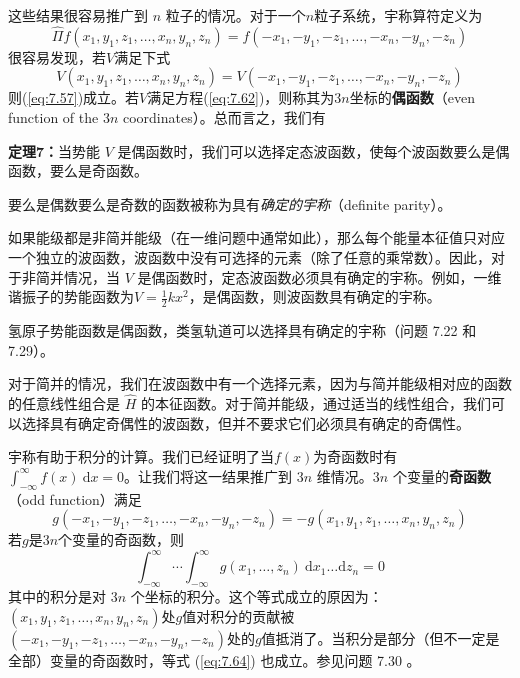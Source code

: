     这些结果很容易推广到 $n$ 粒子的情况。对于一个$n$粒子系统，宇称算符定义为
    \begin{equation}
        \hat{\Pi}f\left(x_1,y_1,z_1,\ldots,x_n,y_n,z_n\right) = f\left(-x_1,-y_1,-z_1,\ldots,-x_n,-y_n,-z_n\right)
        \label{eq:7.61}
    \end{equation}
    很容易发现，若$V$满足下式
    \begin{equation}
        V\left(x_1,y_1,z_1,\ldots,x_n,y_n,z_n\right) = V\left(-x_1,-y_1,-z_1,\ldots,-x_n,-y_n,-z_n\right)
        \label{eq:7.62}
    \end{equation}
    则(\ref{eq:7.57})成立。若$V$满足方程(\ref{eq:7.62})，则称其为$3n$坐标的\textbf{偶函数}（even function of the $3n$ coordinates）。总而言之，我们有
    \begin{center}
        \parbox{0.8\textwidth}{
            \textbf{定理7：}当势能 $V$ 是偶函数时，我们可以选择定态波函数，使每个波函数要么是偶函数，要么是奇函数。
        }
    \end{center}

    要么是偶数要么是奇数的函数被称为具有\textit{确定的宇称}（definite parity）。

    如果能级都是非简并能级（在一维问题中通常如此），那么每个能量本征值只对应一个独立的波函数，波函数中没有可选择的元素（除了任意的乘常数）。因此，对于非简并情况，当 $V$ 是偶函数时，定态波函数必须具有确定的宇称。例如，一维谐振子的势能函数为$V = \frac{1}{2}kx^2$，是偶函数，则波函数具有确定的宇称。

    氢原子势能函数是偶函数，类氢轨道可以选择具有确定的宇称（问题 7.22 和 7.29）。

    对于简并的情况，我们在波函数中有一个选择元素，因为与简并能级相对应的函数的任意线性组合是 $\hat{H}$ 的本征函数。对于简并能级，通过适当的线性组合，我们可以选择具有确定奇偶性的波函数，但并不要求它们必须具有确定的奇偶性。

    宇称有助于积分的计算。我们已经证明了当$f\left(x\right)$为奇函数时有$\int_{-\infty}^{\infty}f\left(x\right)\:\mathrm{d}x = 0$。让我们将这一结果推广到 $3n$ 维情况。$3n$ 个变量的\textbf{奇函数}（odd function）满足
    \begin{equation}
        g\left(-x_1,-y_1,-z_1,\ldots,-x_n,-y_n,-z_n\right) = -g\left(x_1,y_1,z_1,\ldots,x_n,y_n,z_n\right)
        \label{eq:7.63}
    \end{equation}
    若$g$是$3n$个变量的奇函数，则
    \begin{equation}
        \int_{-\infty}^{\infty}\cdots\int_{-\infty}^{\infty}g\left(x_1,\ldots,z_n\right)\:\mathrm{d}x_1\ldots\mathrm{d}z_n = 0
        \label{eq:7.64}
    \end{equation}
    其中的积分是对 $3n$ 个坐标的积分。这个等式成立的原因为：$\left(x_1,y_1,z_1,\ldots,x_n,y_n,z_n\right)$处$g$值对积分的贡献被$\left(-x_1,-y_1,-z_1,\ldots,-x_n,-y_n,-z_n\right)$处的$g$值抵消了。当积分是部分（但不一定是全部）变量的奇函数时，等式 (\ref{eq:7.64}) 也成立。参见问题 7.30 。

